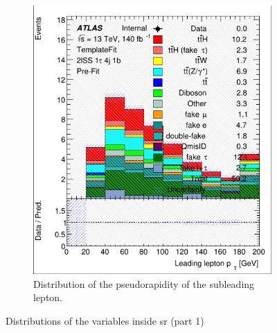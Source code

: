 \begin{figure}[htb!]
\begin{subfigure}{0.45\textwidth}
        \includegraphics[width=\linewidth]{figures/plots/histograms/lep_Eta_1.png}
        \caption{Distribution of the pseudorapidity of the subleading lepton.}
        \label{fig:lep_Eta_1}
    \end{subfigure}
    \caption{Distributions of the variables inside \gls{sr} (part 1)}
    \label{fig:distributions1}
\end{figure}

\newpage

